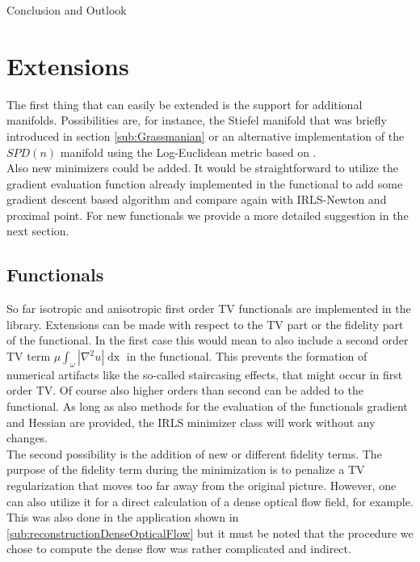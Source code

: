 \begin{chapter}{Conclusion and Outlook}
\label{ch:outlook}

\section{Extensions} %
\label{sec:Extensions}
The first thing that can easily be extended is the support for additional manifolds. Possibilities are, for instance, the Stiefel manifold that
was briefly introduced in section \ref{sub:Grassmanian} or an alternative implementation of the $SPD(n)$ manifold using the Log-Euclidean metric
based on \cite{LogEuclidian}.\\

Also new minimizers could be added. It would be straightforward to utilize the gradient evaluation function already implemented in the functional to
add some gradient descent based algorithm and compare again with IRLS-Newton and proximal point. For new functionals we provide a more detailed suggestion
in the next section.

\subsection{Functionals} %
\label{sub:Functionals}
So far isotropic and anisotropic first order TV functionals are implemented in the library. Extensions can be made with respect to the TV part or the fidelity
part of the functional. In the first case this would mean to also include a second order TV term $\mu\int_{\omega}|\nabla^2u|\mathop{dx}$ in the functional.
This prevents the formation of numerical artifacts like the so-called staircasing effects, that might occur in first order TV. Of course also higher orders than second
can be added to the functional. As long as also methods for the evaluation of the functionals gradient and Hessian are provided, the IRLS minimizer class will
work without any changes. \\

The second possibility is the addition of new or different fidelity terms. The purpose of the fidelity term during the minimization is to penalize a TV
regularization that moves too far away from the original picture. However, one can also utilize it for a direct calculation of a dense optical flow field, for
example. This was also done in the application shown in \ref{sub:reconstructionDenseOpticalFlow} but it must be noted that the procedure we chose to compute 
the dense flow was rather complicated and indirect.\\


\end{chapter}
